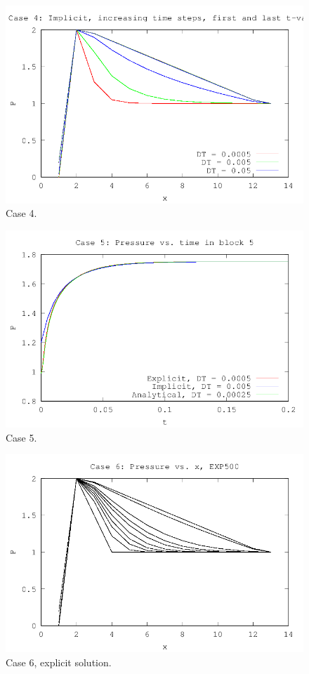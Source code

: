 \documentclass[11pt,a4paper]{article}
\begin{document}
\begin{figure}[H]
  \centering
  \includegraphics[]{../code/case4.png}
  \caption{Case 4.}
  \label{fig:case4}
\end{figure}

\begin{figure}[H]
  \centering
  \includegraphics[]{../code/case5.png}
  \caption{Case 5.}
  \label{fig:case5}
\end{figure}

\begin{figure}[H]
  \centering
  \includegraphics[]{../code/case61.png}
  \caption{Case 6, explicit solution.}
  \label{fig:case61}
\end{figure}
\end{document}
